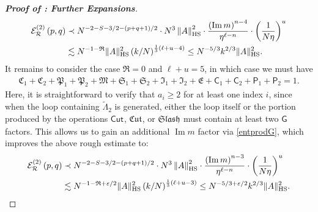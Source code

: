 \documentclass[10pt,reqno]{amsart}
\numberwithin{equation}{section}
\numberwithin{figure}{section}
\theoremstyle{plain} %
\theoremstyle{definition} %
\newcommand{\wt}{\widetilde}
\renewcommand{\txt}[1]{\text{\rm{#1}}}
\newcommand{\cR}{{\mathcal R}}
\newcommand{\cE}{{\mathcal{E}}}
\newcommand{\fR}{\mathfrak R}
\newcommand{\fC}{\mathfrak C}
\newcommand{\fP}{\mathfrak P}
\newcommand{\fM}{\mathfrak M}
\newcommand{\fS}{\mathfrak S}
\newcommand{\fI}{\mathfrak I}
\newcommand{\fE}{\mathfrak E}
\newcommand{\sG}{\mathsf G}
\newcommand{\sC}{\mathsf C}
\newcommand{\sP}{\mathsf P}
\renewcommand{\leq}{\le}
\renewcommand{\geq}{\ge}
\newcommand{\p}[1]{({#1})}
\newcommand{\pa}[1]{\left({#1}\right)}
\newcommand{\norm}[1]{\lVert #1 \rVert}
\newcommand{\norma}[1]{\left\lVert #1 \right\rVert}
\DeclareMathOperator{\im}{\mathrm{Im}}
\newcommand{\tLambda}{{\wt{\Lambda}}}
\newcommand{\scut}[1]{\mathsf{Cut}_{#1}}
\newcommand{\fcut}[1]{\mathfrak{Cut}_{#1}}
\newcommand{\fslash}[1]{\mathfrak{Slash}_{#1}}
\newcommand{\HS}{\txt{HS}}
\newcommand{\tl}{\tLambda}
\newcommand{\mm}{\ell}
\numberwithin{equation}{section}
\begin{document}
\begin{proof}[\bf Proof of : Further Expansions]
        \begin{equation}\nonumber
            \begin{aligned}
        {\cE_{\cR}^{\pa{2}}\pa{p,q}}&\prec N^{-2-S-3/2-\pa{p+q+1}/2}\cdot N^{3}\norma{A}_{\HS}^2\cdot \frac{\pa{\im m}^{n-4}}{\eta^{\mm-n}}\cdot \pa{\frac{1}{N\eta}}^{u}\\
                &\lesssim N^{-1-\fR}\norm{A}_{\HS}^2\pa{k/N}^{\frac13\p{\mm+u-4}}\leq N^{-5/3}k^{2/3}\norm{A}_{\HS}^2.
            \end{aligned}
        \end{equation}
        It remains to consider the case $\fR=0$ and $\mm+u=5$, in which case we must have
        \begin{equation}\nonumber
            \begin{aligned}
                \fC_1+\fC_2+\fP_1+\fP_2+\fM+\fS_1+\fS_2+\fI_1+\fI_2+\fE+\sC_1+\sC_2+\sP_1+\sP_2= 1.
            \end{aligned}
        \end{equation}
    Here, it is straightforward to verify that $a_i \geq 2$ for at least one index $i$, since when the loop containing $\tl_2$ is generated, either the loop itself or the portion produced by the operations $\scut{}$, $\fcut{}$, or $\fslash{}$ must contain at least two $\sG$ factors. This allows us to gain an additional $\im m$ factor via \eqref{entprodG}, which improves the above rough estimate to: 
        \begin{equation}\nonumber
            \begin{aligned}
         {\cE_{\cR}^{\pa{2}}\pa{p,q}}&\prec N^{-2-S-3/2-\pa{p+q+1}/2}\cdot N^{3}\norma{A}_{\HS}^2\cdot \frac{\pa{\im m}^{n-3}}{\eta^{\mm-n}}\cdot \pa{\frac{1}{N\eta}}^{u}\\
       & \lesssim N^{-1-\fR+\varepsilon/2}\norm{A}_{\HS}^2\pa{k/N }^{\frac 13 \p{\mm+u-3}}\leq N^{-5/3+\varepsilon/2}k^{2/3}\norm{A}_{\HS}^2.
            \end{aligned}
        \end{equation}

\smallskip


\end{proof}
\end{document}
